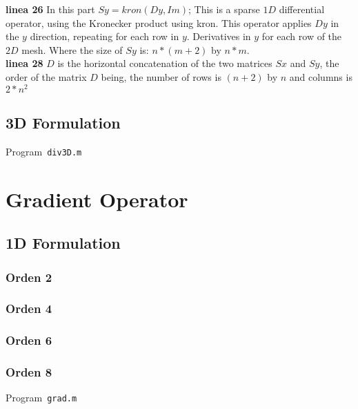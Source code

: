 \textbf{linea 26} In this part $Sy = kron(Dy, Im)$; This is a sparse $1D$ differential operator, using the Kronecker product using kron. This operator applies $Dy$ in the $y$ direction, repeating for each row in $y$. Derivatives in $y$ for each row of the $2D$ mesh. Where the size of $Sy$ is: $n*(m+2)$ by $n*m$.\\

\textbf{linea 28} $D$ is the horizontal concatenation of the two matrices $Sx$ and $Sy$, the order of the matrix $D$ being, the number of rows is $(n+2)$ by $n$ and columns is $2*n^{2}$

\subsection{3D Formulation}

\begin{octavelisting}
	\tiny
	\centering
	\caption{Program~\texttt{div3D.m}}
	\label{code:div3D.m}
\end{octavelisting}

\section{Gradient Operator}

\subsection{1D Formulation}

\subsubsection{Orden 2}
\subsubsection{Orden 4}
\subsubsection{Orden 6}
\subsubsection{Orden 8}

\begin{octavelisting}
	\tiny
	\centering
	\caption{Program~\texttt{grad.m}}
	\label{code:grad.m}
\end{octavelisting}

